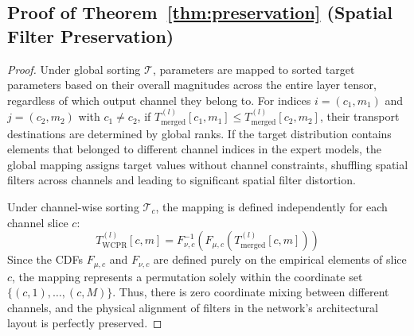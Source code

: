 \documentclass{article}
\theoremstyle{plain}
\theoremstyle{definition}
\theoremstyle{remark}
\begin{document}
\subsection{Proof of Theorem~\ref{thm:preservation} (Spatial Filter Preservation)}
\label{app:proof_preservation}
\begin{proof}
  Under global sorting $\mathcal{T}$, parameters are mapped to sorted target parameters based on their overall magnitudes across the entire layer tensor, regardless of which output channel they belong to. For indices $i = (c_1, m_1)$ and $j = (c_2, m_2)$ with $c_1 \neq c_2$, if $T^{(l)}_{\text{merged}}[c_1, m_1] \leq T^{(l)}_{\text{merged}}[c_2, m_2]$, their transport destinations are determined by global ranks. If the target distribution contains elements that belonged to different channel indices in the expert models, the global mapping assigns target values without channel constraints, shuffling spatial filters across channels and leading to significant spatial filter distortion.
  
  Under channel-wise sorting $\mathcal{T}_c$, the mapping is defined independently for each channel slice $c$:
  \begin{equation}
    T^{(l)}_{\text{WCPR}}[c, m] = F_{\nu, c}^{-1}\left(F_{\mu, c}\left(T^{(l)}_{\text{merged}}[c, m]\right)\right)
  \end{equation}
  Since the CDFs $F_{\mu, c}$ and $F_{\nu, c}$ are defined purely on the empirical elements of slice $c$, the mapping represents a permutation solely within the coordinate set $\{ (c, 1), \dots, (c, M) \}$. Thus, there is zero coordinate mixing between different channels, and the physical alignment of filters in the network's architectural layout is perfectly preserved.
\end{proof}
\end{document}
